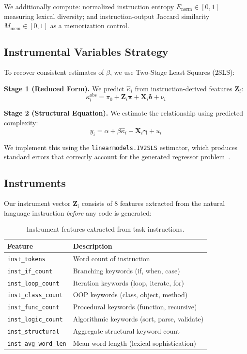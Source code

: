 \documentclass[conference]{IEEEtran}
\begin{document}
We additionally compute: normalized instruction entropy $E_{\text{norm}} \in [0,1]$ measuring lexical diversity; and instruction-output Jaccard similarity $M_{\text{mem}} \in [0,1]$ as a memorization control.

\subsection{Instrumental Variables Strategy}

To recover consistent estimates of $\beta$, we use Two-Stage Least Squares (2SLS):

\textbf{Stage 1 (Reduced Form).} We predict $\hat{\kappa}_i$ from instruction-derived features $\mathbf{Z}_i$:
\begin{equation}
    \kappa_i^{\text{obs}} = \pi_0 + \mathbf{Z}_i \boldsymbol{\pi} + \mathbf{X}_i \boldsymbol{\delta} + \nu_i
    \label{eq:stage1}
\end{equation}

\textbf{Stage 2 (Structural Equation).} We estimate the relationship using predicted complexity:
\begin{equation}
    y_i = \alpha + \beta \hat{\kappa}_i + \mathbf{X}_i \boldsymbol{\gamma} + u_i
    \label{eq:stage2}
\end{equation}

We implement this using the \texttt{linearmodels.IV2SLS} estimator, which produces standard errors that correctly account for the generated regressor problem~\cite{wooldridge2010econometric}.

\subsection{Instruments}

Our instrument vector $\mathbf{Z}_i$ consists of 8 features extracted from the natural language instruction \emph{before} any code is generated:

\begin{table}[h]
\centering
\caption{Instrument features extracted from task instructions.}
\label{tab:instruments}
\begin{tabular}{@{}ll@{}}
\toprule
Feature & Description \\
\midrule
\texttt{inst\_tokens} & Word count of instruction \\
\texttt{inst\_if\_count} & Branching keywords (if, when, case) \\
\texttt{inst\_loop\_count} & Iteration keywords (loop, iterate, for) \\
\texttt{inst\_class\_count} & OOP keywords (class, object, method) \\
\texttt{inst\_func\_count} & Procedural keywords (function, recursive) \\
\texttt{inst\_logic\_count} & Algorithmic keywords (sort, parse, validate) \\
\texttt{inst\_structural} & Aggregate structural keyword count \\
\texttt{inst\_avg\_word\_len} & Mean word length (lexical sophistication) \\
\bottomrule
\end{tabular}
\end{table}
\end{document}
